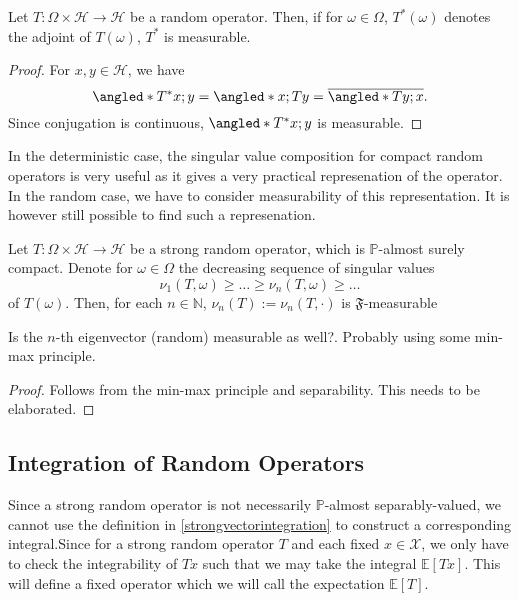 \begin{lem}[Adjoint]
    Let \( T: \Omega \times \mathcal{H} \to \mathcal{H} \) be a random operator. Then, if for \( \omega \in \Omega  \), \( T^{*}(\omega ) \) denotes the adjoint of \( T(\omega ) \), \( T^{*} \) is measurable.
\end{lem}

\begin{proof}
    For \( x,y \in \mathcal{H} \), we have 
    \[ \angled*{T^{*}x;y}= \angled*{x;Ty} = \overline{\angled*{Ty;x}} .\]
    Since conjugation is continuous, \( \angled*{T^{*}x;y} \) is measurable.
\end{proof}

In the deterministic case, the singular value composition for compact random operators is very useful as it gives a very practical represenation of the operator. In the random case, we have to consider measurability of this representation. It is however still possible to find such a represenation.
\begin{thm}
    Let \( T: \Omega \times \mathcal{H} \to \mathcal{H}\) be a strong random operator, which is \( \mathbb{P} \)-almost surely compact. Denote for \( \omega \in \Omega  \) the decreasing sequence of singular values 
    \[ \nu_1 (T,\omega) \geq \dots \geq \nu_n(T,\omega) \geq \dots \] of \( T(\omega ) \). Then, for each \( n\in \mathbb{N} \), \( \nu_n(T):= \nu_n(T,\cdot) \) is \( \mathfrak{F} \)-measurable
\end{thm}
Is the \( n \)-th eigenvector (random) measurable as well?. Probably using some min-max principle.
\begin{proof}
    Follows from the min-max principle and separability. This needs to be elaborated.
\end{proof}




\subsection{Integration of Random Operators}
Since a strong random operator is not necessarily \( \mathbb{P} \)-almost separably-valued, we cannot use the definition in \ref{strongvectorintegration} to construct a corresponding integral.Since for a strong random operator \( T \) and each fixed \( x\in \mathcal{X} \), we only have to check the integrability of \( Tx \) such that we may take the integral \( \mathbb{E}\left[Tx\right] \). This will define a fixed operator which we will call the expectation \( \mathbb{E}\left[T\right] \).

